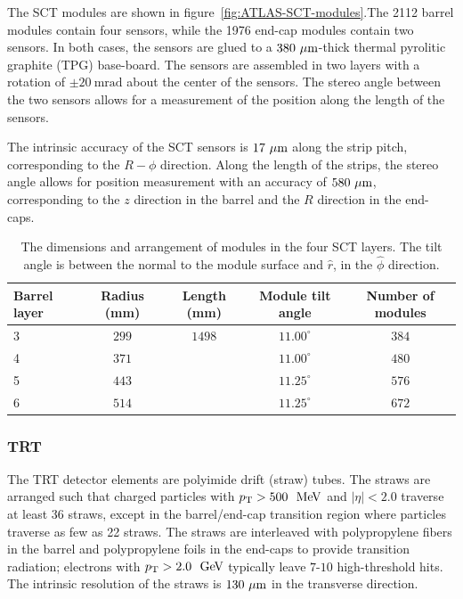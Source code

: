 The SCT modules are shown in figure~\ref{fig:ATLAS-SCT-modules}.The 2112 barrel modules contain four sensors, while the 1976 end-cap modules contain two sensors. In both cases, the sensors are glued to a $380~\mu\mathrm{m}$-thick thermal pyrolitic graphite (TPG) base-board. The sensors are assembled in two layers with a rotation of $\pm 20~\mbox{mrad}$ about the center of the sensors. The stereo angle between the two sensors allows for a measurement of the position along the length of the sensors. 


The intrinsic accuracy of the SCT sensors is $17~\mu\mathrm{m}$ along the strip pitch, corresponding to the $R-\phi$ direction. Along the length of the strips, the stereo angle allows for position measurement with an accuracy of $580~\mu\mathrm{m}$, corresponding to the $z$ direction in the barrel and the $R$ direction in the end-caps.

\begin{table}[htbp]
	\centering
	\scriptsize
	\begin{tabular}{|l|c|c|c|c|}
		\hline
		\textbf{Barrel layer} & \textbf{Radius (mm)} & \textbf{Length (mm)} & \textbf{Module tilt angle} & \textbf{Number of modules} \\
		\hline
		3 & $299$ & $1498$ & $11.00^{\circ}$ & $384$ \\
		4 & $371$ & & $11.00^{\circ}$ & $480$ \\
		5 & $443$ & & $11.25^{\circ}$ & $576$ \\
		6 & $514$ & & $11.25^{\circ}$ & $672$ \\
		\hline
	\end{tabular}
	\caption{The dimensions and arrangement of modules in the four SCT layers. The tilt angle is between the normal to the module surface and $\hat{r}$, in the $\hat{\phi}$ direction.}
	\label{fig:ATLAS-SCT-layout}
\end{table}

\subsubsection{TRT}\label{sec:ATLAS-id-trt}

The TRT detector elements are polyimide drift (straw) tubes. The straws are arranged such that charged particles with $\pt > 500~\MeV$ and $|\eta|<2.0$ traverse at least 36 straws, except in the barrel/end-cap transition region where particles traverse as few as 22 straws. The straws are interleaved with polypropylene fibers in the barrel and polypropylene foils in the end-caps to provide transition radiation; electrons with $\pt>2.0~\GeV$ typically leave $7$-$10$ high-threshold hits. The intrinsic resolution of the straws is $130~\mu\mathrm{m}$ in the transverse direction.

